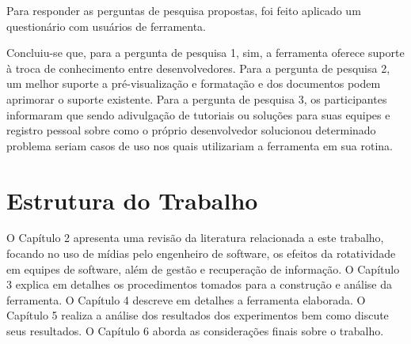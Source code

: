 Para responder as perguntas de pesquisa propostas, foi feito aplicado um questionário com usuários de ferramenta.

Concluiu-se que, para a pergunta de pesquisa 1, sim, a ferramenta oferece suporte à troca de conhecimento entre desenvolvedores. Para a pergunta de pesquisa 2, um melhor suporte a pré-visualização e formatação e dos documentos podem aprimorar o suporte existente. Para a pergunta de pesquisa 3, os participantes informaram que sendo adivulgação de tutoriais ou soluções para suas equipes e registro pessoal sobre como o próprio desenvolvedor solucionou determinado problema seriam casos de uso nos quais utilizariam a ferramenta em sua rotina.

\section{Estrutura do Trabalho}

O Capítulo 2 apresenta uma revisão da literatura relacionada a este trabalho, focando no uso de mídias pelo engenheiro de software, os efeitos da rotatividade em equipes de software, além de gestão e recuperação de informação. O Capítulo 3 explica em detalhes os procedimentos tomados para a construção e análise da ferramenta. O Capítulo 4 descreve em detalhes a ferramenta elaborada. O Capítulo 5 realiza a análise dos resultados dos experimentos bem como discute seus resultados. O Capítulo 6 aborda as considerações finais sobre o trabalho.
